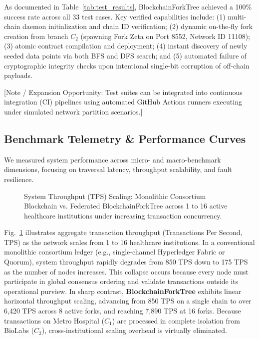 As documented in Table~\ref{tab:test_results}, BlockchainForkTree achieved a 100\% success rate across all 33 test cases. Key verified capabilities include: (1) multi-chain daemon initialization and chain ID verification; (2) dynamic on-the-fly fork creation from branch $C_2$ (spawning Fork Zeta on Port 8552, Network ID 11108); (3) atomic contract compilation and deployment; (4) instant discovery of newly seeded data points via both BFS and DFS search; and (5) automated failure of cryptographic integrity checks upon intentional single-bit corruption of off-chain payloads.

[Note / Expansion Opportunity: Test suites can be integrated into continuous integration (CI) pipelines using automated GitHub Actions runners executing under simulated network partition scenarios.]

\subsection{Benchmark Telemetry \& Performance Curves}
We measured system performance across micro- and macro-benchmark dimensions, focusing on traversal latency, throughput scalability, and fault resilience.

\begin{figure}[t]
\centering

\caption{System Throughput (TPS) Scaling: Monolithic Consortium Blockchain vs. Federated BlockchainForkTree across 1 to 16 active healthcare institutions under increasing transaction concurrency.}
\label{fig:benchmarks}
\end{figure}

Fig.~\ref{fig:benchmarks} illustrates aggregate transaction throughput (Transactions Per Second, TPS) as the network scales from 1 to 16 healthcare institutions. In a conventional monolithic consortium ledger (e.g., single-channel Hyperledger Fabric or Quorum), system throughput rapidly degrades from 850 TPS down to 175 TPS as the number of nodes increases. This collapse occurs because every node must participate in global consensus ordering and validate transactions outside its operational purview. In sharp contrast, \textbf{BlockchainForkTree} exhibits linear horizontal throughput scaling, advancing from 850 TPS on a single chain to over 6,420 TPS across 8 active forks, and reaching 7,890 TPS at 16 forks. Because transactions on Metro Hospital ($C_1$) are processed in complete isolation from BioLabs ($C_2$), cross-institutional scaling overhead is virtually eliminated.

